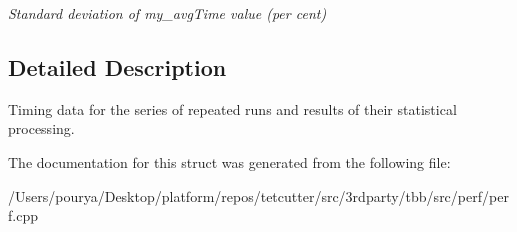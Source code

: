 \begin{DoxyCompactItemize}
\begin{DoxyCompactList}\small\item\em Standard deviation of my\+\_\+avg\+Time value (per cent) \end{DoxyCompactList}\end{DoxyCompactItemize}


\subsection{Detailed Description}
Timing data for the series of repeated runs and results of their statistical processing. 

The documentation for this struct was generated from the following file\+:\begin{DoxyCompactItemize}
\item 
/\+Users/pourya/\+Desktop/platform/repos/tetcutter/src/3rdparty/tbb/src/perf/perf.\+cpp\end{DoxyCompactItemize}
